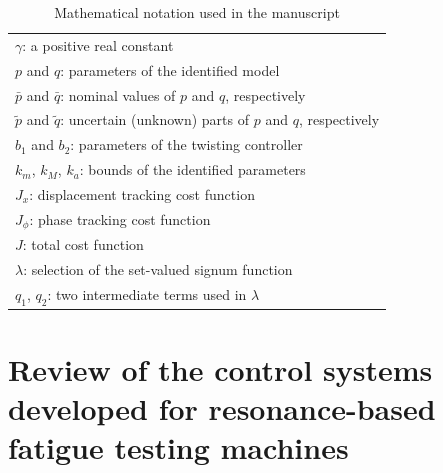 \documentclass[lettersize,journal]{IEEEtran}
\begin{document}
\begin{table}[h]
\begin{tabular}{|l|}
$\gamma$: a positive real constant \\
$p$ and $q$: parameters of the identified model \\
$\bar{p}$ and $\bar{q}$: nominal values of $p$ and $q$, respectively \\
$\tilde{p}$ and $\tilde{q}$: uncertain (unknown) parts of $p$ and $q$, respectively \\
$b_1$ and $b_2$: parameters of the twisting controller \\
$k_m$, $k_M$, $k_a$: bounds of the identified parameters \\
$J_x$: displacement tracking cost function \\
 $J_\phi$: phase tracking cost function \\
$J$: total cost function \\
$\lambda$: selection of the set-valued signum function \\
$q_1$, $q_2$: two intermediate terms used in $\lambda$ \\
\hline
    \end{tabular}
    \vspace{0.1cm}
    \caption{Mathematical notation used in the manuscript}
    \label{T_notation}
\end{table}


\section{Review of the control systems developed for resonance-based fatigue testing machines} \label{S_control_system}
\end{document}

